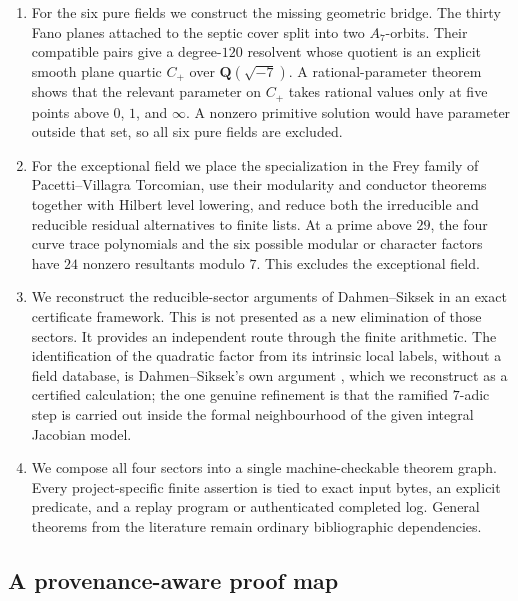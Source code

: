 \documentclass[11pt]{article}
\newcommand{\Q}{\mathbf Q}
\theoremstyle{definition}
\theoremstyle{remark}
\begin{document}
\begin{enumerate}[label=\textnormal{(\roman*)},leftmargin=2.2em]
\item For the six pure fields we construct the missing geometric bridge.
The thirty Fano planes attached to the septic cover split into two
$A_7$-orbits.  Their compatible pairs give a degree-$120$ resolvent whose
quotient is an explicit smooth plane quartic $C_+$ over
$\Q(\sqrt{-7})$.  A rational-parameter theorem shows that the relevant
parameter on $C_+$ takes rational values only at five points above
$0$, $1$, and $\infty$.  A nonzero primitive solution would have parameter
outside that set, so all six pure fields are excluded.

\item For the exceptional field we place the specialization in the Frey
family of Pacetti--Villagra Torcomian, use their modularity and conductor
theorems together with Hilbert level lowering, and reduce both the
irreducible and reducible residual alternatives to finite lists.  At a prime
above $29$, the four curve trace polynomials and the six possible modular or
character factors have $24$ nonzero resultants modulo $7$.  This excludes the
exceptional field.

\item We reconstruct the reducible-sector arguments of Dahmen--Siksek in an exact
certificate framework.  This is not presented as a new elimination of those
sectors.  It provides an independent route through the finite arithmetic.  The
identification of the quadratic factor from its intrinsic local labels,
without a field database, is Dahmen--Siksek's own argument
\cite[Proposition~4.2]{DahmenSiksek}, which we reconstruct as a certified
calculation; the one genuine refinement is that the ramified $7$-adic
step is carried out inside the formal neighbourhood of the given integral
Jacobian model.

\item We compose all four sectors into a single machine-checkable theorem
graph.  Every project-specific finite assertion is tied to exact input bytes,
an explicit predicate, and a replay program or authenticated completed log.
General theorems from the literature remain ordinary bibliographic dependencies.
\end{enumerate}

\subsection{A provenance-aware proof map}
\end{document}
